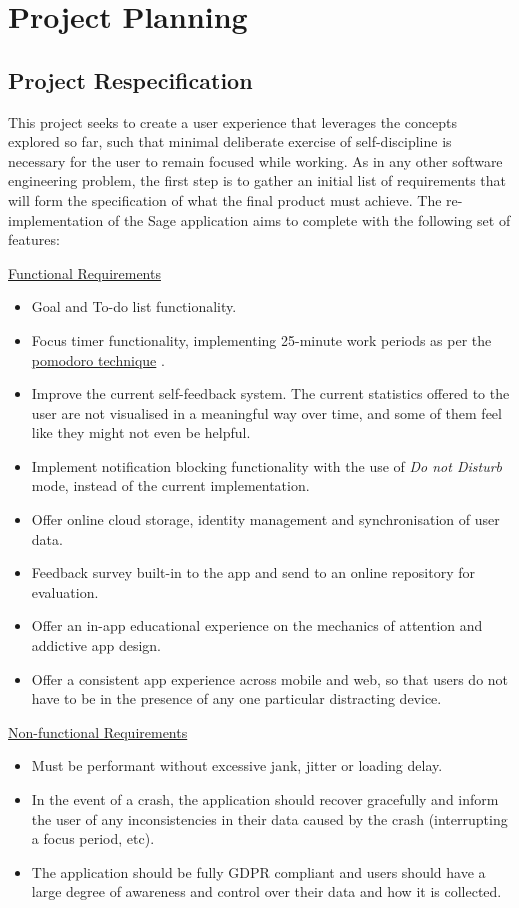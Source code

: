 \chapter{Project Planning}

\section{Project Respecification}
This project seeks to create a user experience that leverages the concepts explored so far, such that minimal deliberate exercise of self-discipline is necessary for the user to remain focused while working. As in any other software engineering problem, the first step is to gather an initial list of requirements that will form the specification of what the final product must achieve. The re-implementation of the Sage application aims to complete with the following set of features:

\underline{Functional Requirements}
\begin{itemize}
    \item Goal and To-do list functionality.
    \item Focus timer functionality, implementing 25-minute work periods as per the \href{http://www.baomee.info/pdf/technique/1.pdf}{pomodoro technique} \cite{cirillo2006pomodoro}.
    \item Improve the current self-feedback system. The current statistics offered to the user are not visualised in a meaningful way over time, and some of them feel like they might not even be helpful.
    \item Implement notification blocking functionality with the use of \textit{Do not Disturb} mode, instead of the current implementation.
    \item Offer online cloud storage, identity management and synchronisation of user data.
    \item Feedback survey built-in to the app and send to an online repository for evaluation.
    \item Offer an in-app educational experience on the mechanics of attention and addictive app design.
    \item Offer a consistent app experience across mobile and web, so that users do not have to be in the presence of any one particular distracting device.
\end{itemize}

\underline{Non-functional Requirements}
\begin{itemize}
    \item Must be performant without excessive jank, jitter or loading delay.
    \item In the event of a crash, the application should recover gracefully and inform the user of any inconsistencies in their data caused by the crash (interrupting a focus period, etc).
    \item The application should be fully GDPR compliant and users should have a large degree of awareness and control over their data and how it is collected.
\end{itemize}

